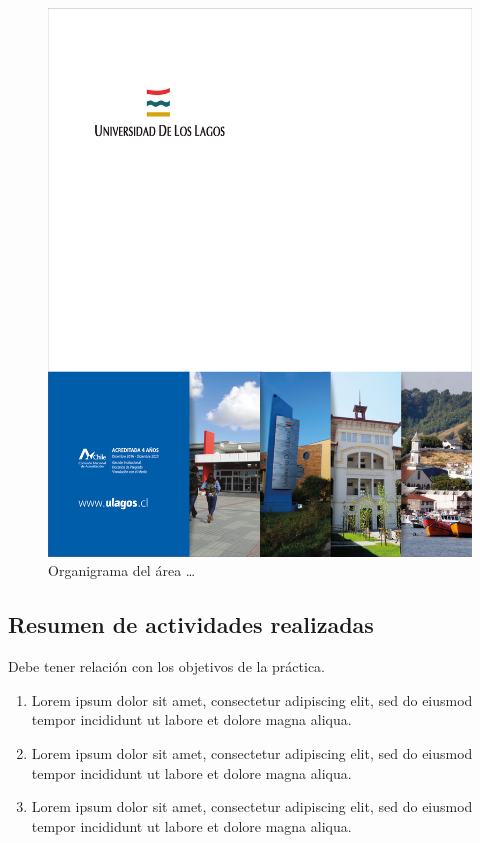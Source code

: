 \documentclass[letter,12pt]{report}
\begin{document}
\begin{figure}[H]
\centering
 \includegraphics[scale=0.1]{portada}
  \caption{Organigrama del área \dots}
\end{figure}



\subsection{Resumen de actividades realizadas}\label{actividades}
Debe tener relación con los objetivos de la práctica.
\begin{enumerate}\justifying
  \item Lorem ipsum dolor sit amet, consectetur adipiscing elit, sed do eiusmod tempor incididunt ut labore et dolore magna aliqua.
  \item Lorem ipsum dolor sit amet, consectetur adipiscing elit, sed do eiusmod tempor incididunt ut labore et dolore magna aliqua.
  \item Lorem ipsum dolor sit amet, consectetur adipiscing elit, sed do eiusmod tempor incididunt ut labore et dolore magna aliqua.
\end{enumerate}
\end{document}
